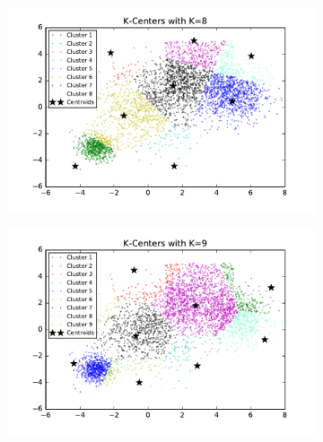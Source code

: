 \begin{figure}[htb]
\begin{subfigure}[b]{0.475\textwidth}
        \end{subfigure}
        \hfill
        \begin{subfigure}[b]{0.475\textwidth}  
            \centering 
            \includegraphics[width=\textwidth]{./figures/bigClustering_kCenter_8.pdf}
        \end{subfigure}
        \begin{subfigure}[b]{0.475\textwidth}   
            \centering 
            \includegraphics[width=\textwidth]{./figures/bigClustering_kCenter_9.pdf}
        \end{subfigure}
        \hfill
        \begin{subfigure}[b]{0.475\textwidth}   
            \centering 

\end{subfigure}
\end{figure}
